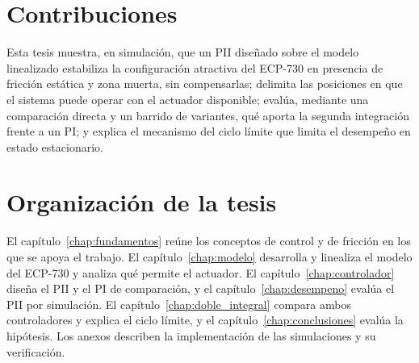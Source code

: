 \section{Contribuciones}

Esta tesis muestra, en simulación, que un PII diseñado sobre el modelo linealizado estabiliza la configuración atractiva del ECP-730 en presencia de fricción estática y zona muerta, sin compensarlas; delimita las posiciones en que el sistema puede operar con el actuador disponible; evalúa, mediante una comparación directa y un barrido de variantes, qué aporta la segunda integración frente a un PI; y explica el mecanismo del ciclo límite que limita el desempeño en estado estacionario.

\section{Organización de la tesis}

El capítulo~\ref{chap:fundamentos} reúne los conceptos de control y de fricción en los que se apoya el trabajo. El capítulo~\ref{chap:modelo} desarrolla y linealiza el modelo del ECP-730 y analiza qué permite el actuador. El capítulo~\ref{chap:controlador} diseña el PII y el PI de comparación, y el capítulo~\ref{chap:desempeno} evalúa el PII por simulación. El capítulo~\ref{chap:doble_integral} compara ambos controladores y explica el ciclo límite, y el capítulo~\ref{chap:conclusiones} evalúa la hipótesis. Los anexos describen la implementación de las simulaciones y su verificación.
